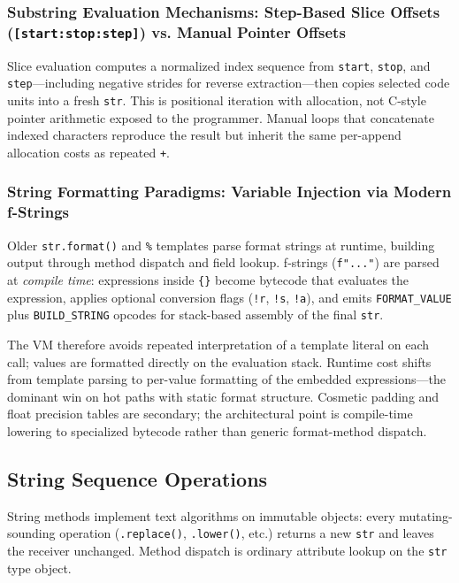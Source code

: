 \documentclass[a4paper,twoside]{report}
\begin{document}
\subsubsection{Substring Evaluation Mechanisms: Step-Based Slice Offsets (\texttt{[start:stop:step]}) vs. Manual Pointer Offsets}

Slice evaluation computes a normalized index sequence from \texttt{start}, \texttt{stop}, and \texttt{step}---including negative strides for reverse extraction---then copies selected code units into a fresh \texttt{str}. This is positional iteration with allocation, not C-style pointer arithmetic exposed to the programmer. Manual loops that concatenate indexed characters reproduce the result but inherit the same per-append allocation costs as repeated \texttt{+}.

\subsubsection{String Formatting Paradigms: Variable Injection via Modern f-Strings}

Older \texttt{str.format()} and \texttt{\%} templates parse format strings at runtime, building output through method dispatch and field lookup. f-strings (\texttt{f"..."}) are parsed at \emph{compile time}: expressions inside \texttt{\{\}} become bytecode that evaluates the expression, applies optional conversion flags (\texttt{!r}, \texttt{!s}, \texttt{!a}), and emits \texttt{FORMAT\_VALUE} plus \texttt{BUILD\_STRING} opcodes for stack-based assembly of the final \texttt{str}.

The VM therefore avoids repeated interpretation of a template literal on each call; values are formatted directly on the evaluation stack. Runtime cost shifts from template parsing to per-value formatting of the embedded expressions---the dominant win on hot paths with static format structure. Cosmetic padding and float precision tables are secondary; the architectural point is compile-time lowering to specialized bytecode rather than generic format-method dispatch.


\subsection{String Sequence Operations}

String methods implement text algorithms on immutable objects: every mutating-sounding operation (\texttt{.replace()}, \texttt{.lower()}, etc.) returns a new \texttt{str} and leaves the receiver unchanged. Method dispatch is ordinary attribute lookup on the \texttt{str} type object.
\end{document}
